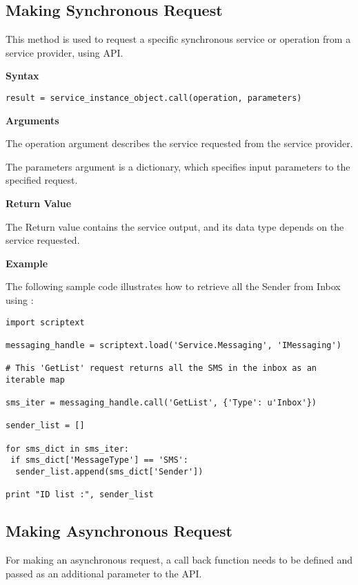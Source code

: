 \subsection{Making Synchronous Request}
\label{subsec:pyrequestsyncservice}

This method is used to request a specific synchronous service or operation from a service provider, using  API.

{\bf Syntax} \break

\begin{verbatim}
result = service_instance_object.call(operation, parameters)
\end{verbatim}

{\bf Arguments} \break

The operation argument describes the service requested from the service provider. \break

The parameters argument is a dictionary, which specifies input parameters to the specified request. \break

{\bf Return Value} \break

The Return value contains the service output, and its data type depends on the service requested.

{\bf Example} \break

The following sample code illustrates how to retrieve all the Sender  from Inbox using :

\begin{verbatim}
import scriptext

messaging_handle = scriptext.load('Service.Messaging', 'IMessaging')

# This 'GetList' request returns all the SMS in the inbox as an iterable map

sms_iter = messaging_handle.call('GetList', {'Type': u'Inbox'})

sender_list = [] 

for sms_dict in sms_iter: 
 if sms_dict['MessageType'] == 'SMS': 
  sender_list.append(sms_dict['Sender'])

print "ID list :", sender_list
\end{verbatim}

\subsection{Making Asynchronous Request}
\label{subsec:pyrequestasyncservice}

For making an asynchronous request, a call back function needs to be defined and passed as an additional parameter to the  API.

